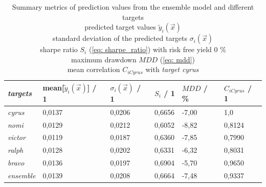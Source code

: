 \documentclass[12pt, a4paper]{article}
\begin{document}

\begin{table}[!htbp]
\centering
\caption{Summary metrics of prediction values from the ensemble model and different targets \\
predicted target values $\tilde{y}_i(\vec{x})$ \\
standard deviation of the predicted targets $\sigma_i(\vec{x})$ \\
sharpe ratio $S_i$ (\ref{eq: sharpe_ratio}) with risk free yield 0 \% \\
maximum drawdown $MDD$ (\ref{eq: mdd}) \\
mean correlation $C_{iCyrus}$ with \textit{target cyrus} \\}
\label{table: summary_metric_predictions_ensemble}
\begin{tabular}{|l|l|l|l|l|l|}
\hline
\textit{targets} & mean[$\tilde{y}_i(\vec{x})$] / 1 & $\sigma_i(\vec{x})$ / 1 & $S_i$ / 1 & $MDD$ / \% & $C_{iCyrus}$ / 1 \\ \hline
\hline
\hline
\textit{cyrus} & 0,0137 & 0,0206 & 0,6656 & -7,00 & 1,0  \\ \hline
\textit{nomi} & 0,0129 & 0,0212 & 0,6052 & -8,82 & 0,8124 \\ \hline
\textit{victor} & 0,0119 & 0,0187 & 0,6360 & -7,85 &  0,7990 \\ \hline
\textit{ralph} & 0,0128 & 0,0202 & 0,6331 & -6,32 & 0,8031 \\ \hline
\textit{bravo} & 0,0136 & 0,0197 & 0,6904 & -5,70 & 0,9650 \\ \hline
\hline
\textit{ensemble} & 0,0139 & 0,0208 & 0,6664 & -7,48 & 0,9337 \\ \hline
\end{tabular}
\end{table}
\end{document}
